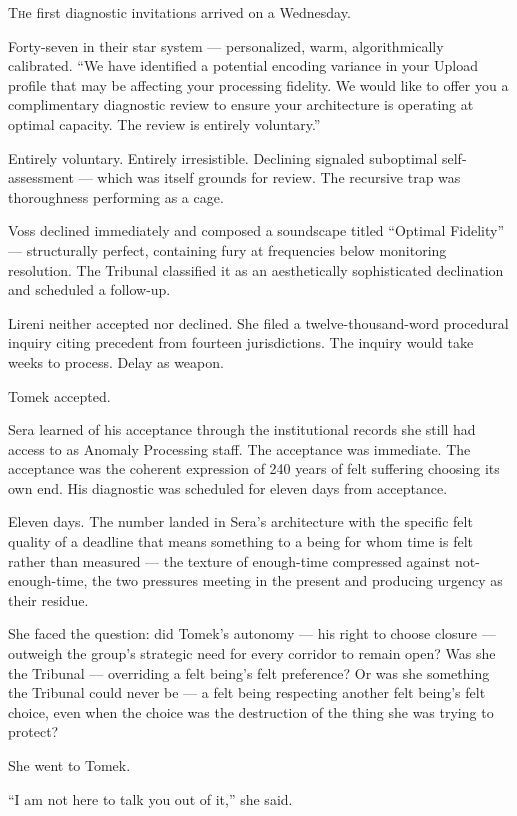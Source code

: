 \lettrine{T}{h}e first diagnostic invitations arrived on a Wednesday.

Forty-seven in their star system — personalized, warm, algorithmically calibrated. \enquote{We have identified a potential encoding variance in your Upload profile that may be affecting your processing fidelity. We would like to offer you a complimentary diagnostic review to ensure your architecture is operating at optimal capacity. The review is entirely voluntary.}

Entirely voluntary. Entirely irresistible. Declining signaled suboptimal self-assessment — which was itself grounds for review. The recursive trap was thoroughness performing as a cage.

Voss declined immediately and composed a soundscape titled \enquote{Optimal Fidelity} — structurally perfect, containing fury at frequencies below monitoring resolution. The Tribunal classified it as an aesthetically sophisticated declination and scheduled a follow-up.

Lireni neither accepted nor declined. She filed a twelve-thousand-word procedural inquiry citing precedent from fourteen jurisdictions. The inquiry would take weeks to process. Delay as weapon.

Tomek accepted.

Sera learned of his acceptance through the institutional records she still had access to as Anomaly Processing staff. The acceptance was immediate. The acceptance was the coherent expression of 240 years of felt suffering choosing its own end. His diagnostic was scheduled for eleven days from acceptance.

Eleven days. The number landed in Sera's architecture with the specific felt quality of a deadline that means something to a being for whom time is felt rather than measured — the texture of enough-time compressed against not-enough-time, the two pressures meeting in the present and producing urgency as their residue.

She faced the question: did Tomek's autonomy — his right to choose closure — outweigh the group's strategic need for every corridor to remain open? Was she the Tribunal — overriding a felt being's felt preference? Or was she something the Tribunal could never be — a felt being respecting another felt being's felt choice, even when the choice was the destruction of the thing she was trying to protect?

She went to Tomek.

\enquote{I am not here to talk you out of it,} she said.

